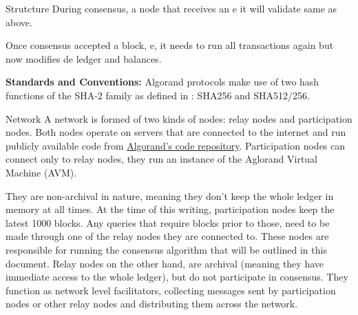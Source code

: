 \documentclass[10pt,a4paper]{article}
\begin{document}
\begin{section}{Strutcture}
During consensus, a node that receives an e it will validate same as above.

Once consensus accepted a block, e, it needs to run all transactions again
but now modifies de ledger and balances. 


{\bf Standards and Conventions:}
Algorand protocols make use of two hash functions of the SHA-2 family
as defined in \cite{NIST.FIPS.180-4}: SHA256 and SHA512/256.

    
\begin{subsection}{Network}
A network is formed of two kinds of nodes: {\sf relay nodes}
and {\sf participation nodes}. 
Both nodes operate on servers that are connected to the internet and run publicly
available code from \href{https://github.com/algorand/go-algorand}{Algorand's code repository}.
Participation nodes can connect only to relay nodes, they run an instance
of the Aglorand Virtual Machine (AVM).


They are non-archival in nature, meaning they don't keep
the whole ledger in memory at all times. At the time of this writing,
participation nodes keep the latest 1000 blocks.
Any queries that require blocks prior to those, need to be made
through one of the relay nodes they are connected to.
These nodes are responsible for running the consensus algorithm that
will be outlined in this document.
Relay nodes on the other hand, are archival (meaning they have immediate
access to the whole ledger), but do not participate in consensus.
They function as network level facilitators, collecting messages sent by participation
nodes or other relay nodes and distributing them across the network.


\end{subsection}
\end{section}
\end{document}
